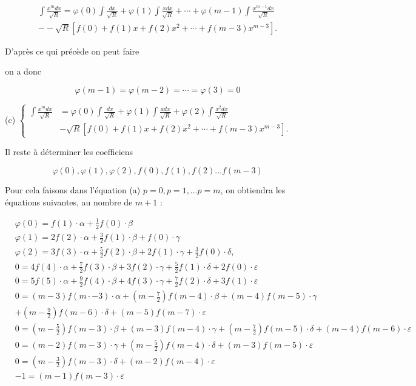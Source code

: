 \documentclass{article}
\begin{document}
\[
\begin{gathered}
\int \frac{x^{m} d x}{\sqrt{R}}=\varphi(0) \int \frac{d x}{\sqrt{R}}+\varphi(1) \int \frac{x d x}{\sqrt{R}}+\cdots+\varphi(m-1) \int \frac{x^{m-1} d x}{\sqrt{R}} \\
--\sqrt{R}\left[f(0)+f(1) x+f(2) x^{2}+\cdots+f(m-3) x^{m-3}\right] .
\end{gathered}
\]

D'après ce qui précède on peut faire

on a donc

\[
\varphi(m-1)=\varphi(m-2)=\cdots=\varphi(3)=0
\]

(c) \(\left\{\begin{aligned} \int \frac{x^{m} d x}{\sqrt{R}} & =\varphi(0) \int \frac{d x}{\sqrt{R}}+\varphi(1) \int \frac{a d x}{\sqrt{R}}+\varphi(2) \int \frac{x^{2} d x}{\sqrt{R}} \\ & -\sqrt{R}\left[f(0)+f(1) x+f(2) x^{2}+\cdots+f(m-3) x^{m-3}\right] .\end{aligned}\right.\)

Il reste à déterminer les coefficiens

\[
\varphi(0), \varphi(1), \varphi(2), f(0), f(1), f(2) \ldots f(m-3)
\]

Pour cela faisons dans l'équation (a) \(p=0, p=1, \ldots p=m\), on obtiendra les équations suivantes, au nombre de \(m+1\) :

\[
\begin{aligned}
& \varphi(0)=f(1) \cdot \alpha+\frac{1}{2} f(0) \cdot \beta \\
& \varphi(1)=2 f(2) \cdot \alpha+\frac{3}{2} f(1) \cdot \beta+f(0) \cdot \gamma \\
& \varphi(2)=3 f(3) \cdot \alpha+\frac{5}{2} f(2) \cdot \beta+2 f(1) \cdot \gamma+\frac{3}{2} f(0) \cdot \delta, \\
& 0=4 f(4) \cdot \alpha+\frac{7}{2} f(3) \cdot \beta+3 f(2) \cdot \gamma+\frac{5}{2} f(1) \cdot \delta+2 f(0) \cdot \varepsilon \\
& 0=5 f(5) \cdot \alpha+\frac{9}{2} f(4) \cdot \beta+4 f(3) \cdot \gamma+\frac{7}{2} f(2) \cdot \delta+3 f(1) \cdot \varepsilon \\
& 0=(m-3) f(m \cdot-3) \cdot \alpha+\left(m-\frac{7}{2}\right) f(m-4) \cdot \beta+(m-4) f(m-5) \cdot \gamma \\
& +\left(m-\frac{9}{2}\right) f(m-6) \cdot \delta+(m-5) f(m-7) \cdot \varepsilon \\
& 0=\left(m-\frac{5}{2}\right) f(m-3) \cdot \beta+(m-3) f(m-4) \cdot \gamma+\left(m-\frac{7}{2}\right) f(m-5) \cdot \delta+(m-4) f(m-6) \cdot \varepsilon \\
& 0=(m-2) f(m-3) \cdot \gamma+\left(m-\frac{5}{2}\right) f(m-4) \cdot \delta+(m-3) f(m-5) \cdot \varepsilon \\
& 0=\left(m-\frac{3}{2}\right) f(m-3) \cdot \delta+(m-2) f(m-4) \cdot \varepsilon \\
& -1=(m-1) f(m-3) \cdot \varepsilon
\end{aligned}
\]
\end{document}
